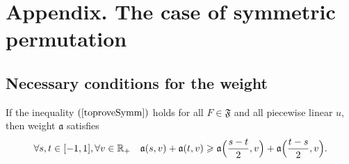 \section{Appendix. The case of symmetric permutation}

\subsection{Necessary conditions for the weight}

\begin{lm}
If the inequality $(\ref{toproveSymm})$ holds for all $F \in \mathfrak{F}$
and all piecewise linear $u$, then
weight $\mathfrak a$ satisfies
\begin{equation}
\label{almostConvex}
\forall s, t \in [-1, 1], \forall v \in \Real_+ \quad
\mathfrak a( s, v ) + \mathfrak a( t, v ) \ge \mathfrak a\Big( \frac{ s - t }{2}, v \Big) + \mathfrak a\Big( \frac{ t - s }{2}, v \Big).
\end{equation}
\end{lm}

